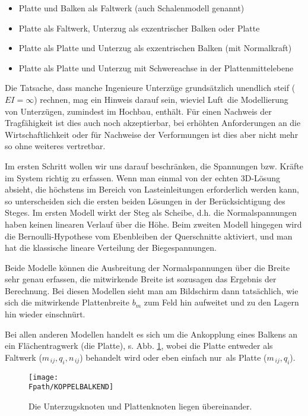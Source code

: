 \begin{itemize}
\item Platte und Balken als Faltwerk (auch Schalenmodell genannt)
\item Platte als Faltwerk, Unterzug als exzentrischer Balken oder Platte
\item Platte als Platte und Unterzug als exzentrischen Balken (mit Normalkraft)
\item Platte als Platte und Unterzug mit Schwereachse in der Plattenmittelebene
\end{itemize}
Die Tatsache, dass manche Ingenieure Unterz\"{u}ge grunds\"{a}tzlich unendlich steif ($EI = \infty$) rechnen, mag ein Hinweis darauf sein, wieviel \glq Luft\grq\ die Modellierung von Unterz\"{u}gen, zumindest im Hochbau, enth\"{a}lt. F\"{u}r einen Nachweis der Tragf\"{a}higkeit ist dies auch noch akzeptierbar, bei erh\"{o}hten Anforderungen an die Wirtschaftlichkeit oder f\"{u}r Nachweise der Verformungen ist dies aber nicht mehr so ohne weiteres vertretbar.

Im ersten Schritt wollen wir uns darauf beschr\"{a}nken, die Spannungen bzw. Kr\"{a}fte im System richtig zu erfassen. Wenn man einmal von der echten 3D-L\"{o}sung absieht, die h\"{o}chstens im Bereich von Lasteinleitungen erforderlich werden kann, so unterscheiden sich die ersten beiden L\"{o}sungen in der Ber\"{u}cksichtigung des Steges. Im ersten Modell wirkt der Steg als Scheibe, d.h. die Normalspannungen haben keinen linearen Verlauf \"{u}ber die H\"{o}he. Beim zweiten Modell hingegen wird die Bernoulli-Hypothese vom Ebenbleiben der Querschnitte aktiviert, und man hat die klassische lineare Verteilung der Biegespannungen.

Beide Modelle k\"{o}nnen die Ausbreitung der Normalspannungen \"{u}ber die Breite sehr genau erfassen, die mitwirkende Breite ist sozusagen das Ergebnis der Berechnung.  Bei diesen Modellen sieht man am Bildschirm dann tats\"{a}chlich, wie sich die mitwirkende Plattenbreite $b_m$ zum Feld hin aufweitet und zu den Lagern hin wieder einschn\"{u}rt.

Bei allen anderen Modellen handelt es sich um die Ankopplung eines Balkens an ein Fl\"{a}chentragwerk (die Platte), s. Abb. \ref{Koppelbalken}, wobei die Platte entweder als Faltwerk ($m_{\,ij},q_i,n_{\,ij}$) behandelt wird oder eben einfach \glq nur\grq\ als Platte ($m_{\,ij},q_i$).

\begin{figure}[tbp]
\centering
\if {} \sidecaption \fi
\texttt{[image: \\Fpath/KOPPELBALKEND]}
\caption{Die Unterzugsknoten und Plattenknoten liegen \"{u}bereinander.} \label{Koppelbalken}
\end{figure}%


